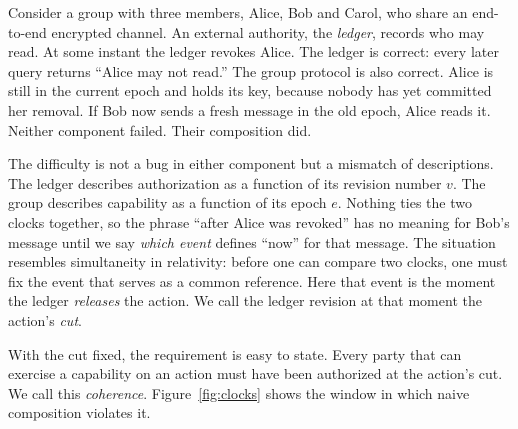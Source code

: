 \documentclass[aps,prx,reprint,superscriptaddress,nofootinbib,floatfix]{revtex4-2}
\theoremstyle{remark}
\begin{document}
Consider a group with three members, Alice, Bob and Carol, who share an end-to-end encrypted channel. An external authority, the \emph{ledger}, records who may read. At some instant the ledger revokes Alice. The ledger is correct: every later query returns ``Alice may not read.'' The group protocol is also correct. Alice is still in the current epoch and holds its key, because nobody has yet committed her removal. If Bob now sends a fresh message in the old epoch, Alice reads it. Neither component failed. Their composition did.

The difficulty is not a bug in either component but a mismatch of descriptions. The ledger describes authorization as a function of its revision number $v$. The group describes capability as a function of its epoch $e$. Nothing ties the two clocks together, so the phrase ``after Alice was revoked'' has no meaning for Bob's message until we say \emph{which event} defines ``now'' for that message. The situation resembles simultaneity in relativity: before one can compare two clocks, one must fix the event that serves as a common reference. Here that event is the moment the ledger \emph{releases} the action. We call the ledger revision at that moment the action's \emph{cut}.

With the cut fixed, the requirement is easy to state. Every party that can exercise a capability on an action must have been authorized at the action's cut. We call this \emph{coherence}. Figure~\ref{fig:clocks} shows the window in which naive composition violates it.
\end{document}
